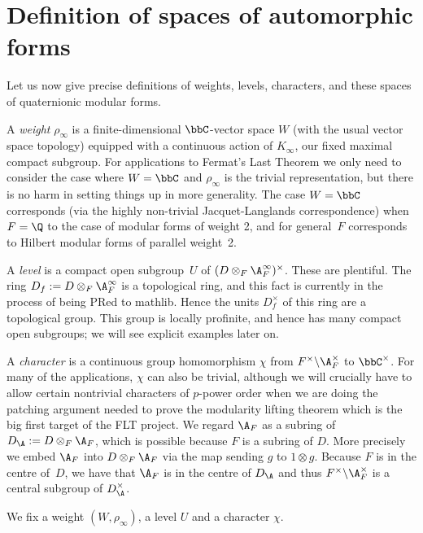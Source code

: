 \section{Definition of spaces of automorphic forms}

Let us now give precise definitions of weights, levels, characters, and these spaces of quaternionic
modular forms.

A \emph{weight} $\rho_\infty$ is a finite-dimensional $\bbC$-vector space $W$ (with the
usual vector space topology) equipped with a continuous action of $K_\infty$, our fixed maximal
compact subgroup. For applications
to Fermat's Last Theorem we only need to consider the case where $W=\bbC$ and $\rho_\infty$
is the trivial representation, but there is no harm in setting things up in more generality.
The case $W=\bbC$ corresponds (via the highly non-trivial Jacquet-Langlands correspondence)
when $F=\Q$ to the case of modular forms of weight 2, and for general~$F$ corresponds to
Hilbert modular forms of parallel weight~2.

A \emph{level} is a compact open subgroup~$U$ of $(D\otimes_F\A_F^\infty)^\times$. These are
plentiful. The ring $D_f:=D\otimes_F\A_F^\infty$ is a topological ring, and this fact is currently
in the process of being PRed to mathlib. Hence the units $D_f^\times$ of this ring
are a topological group. This group is locally profinite, and hence has many compact open subgroups;
we will see explicit examples later on.

A \emph{character} is a continuous group homomorphism $\chi$ from $F^\times\backslash\A_F^\times$ to
$\bbC^\times$. For many of the applications, $\chi$ can also be trivial, although we will crucially
have to allow certain nontrivial characters of $p$-power order when we are doing the patching
argument needed to prove the modularity lifting theorem which is the big first target of the FLT
project. We regard $\A_F$ as a subring of $D_{\A}:=D\otimes_F\A_F$, which is possible because
$F$ is a subring of $D$. More precisely we embed $\A_F$ into $D\otimes_F\A_F$
via the map sending $g$ to $1\otimes g$. Because $F$ is in the centre of~$D$, we have
that $\A_F$ is in the centre of $D_{\A}$ and thus $F^\times\backslash\A_F^\times$
is a central subgroup of $D_{\A}^\times$.

We fix a weight $(W,\rho_{\infty})$, a level $U$ and a character $\chi$.

